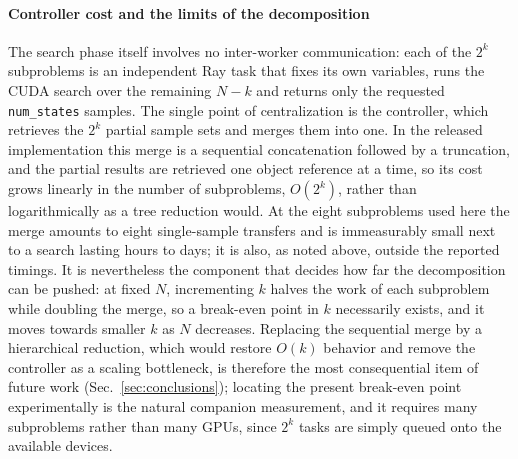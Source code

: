 \documentclass[preprint,12pt,a4paper]{elsarticle}
\begin{document}
\paragraph{Controller cost and the limits of the decomposition}
The search phase itself involves no inter-worker communication: each of the
$2^{k}$ subproblems is an independent Ray task that fixes its own variables, runs
the CUDA search over the remaining $N-k$ and returns only the requested
\texttt{num\_states} samples. The single point of centralization is the
controller, which retrieves the $2^{k}$ partial sample sets and merges them into
one. In the released implementation this merge is a sequential concatenation
followed by a truncation, and the partial results are retrieved one object
reference at a time, so its cost grows linearly in the number of subproblems,
$O(2^{k})$, rather than logarithmically as a tree reduction would. At the eight
subproblems used here the merge amounts to eight single-sample transfers and is
immeasurably small next to a search lasting hours to days; it is also, as noted
above, outside the reported timings. It is nevertheless the component that
decides how far the decomposition can be pushed: at fixed $N$, incrementing $k$
halves the work of each subproblem while doubling the merge, so a break-even
point in $k$ necessarily exists, and it moves towards smaller $k$ as $N$
decreases. Replacing the sequential merge by a hierarchical reduction, which
would restore $O(k)$ behavior and remove the controller as a scaling
bottleneck, is therefore the most consequential item of future work
(Sec.~\ref{sec:conclusions}); locating the present break-even point
experimentally is the natural companion measurement, and it requires many
subproblems rather than many GPUs, since $2^{k}$ tasks are simply queued onto the
available devices.
\end{document}
